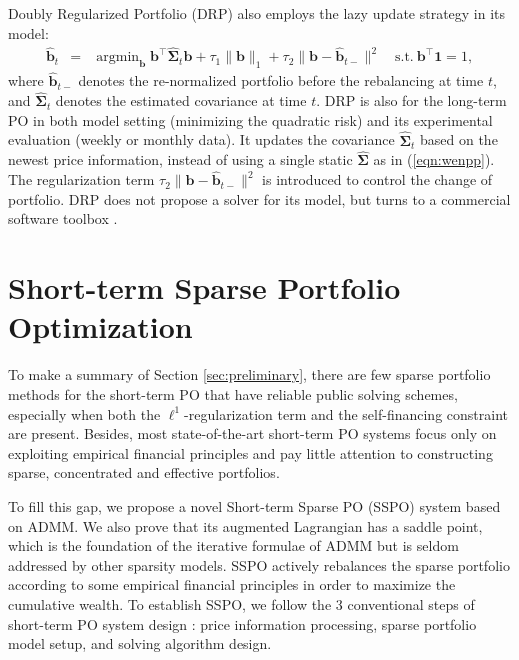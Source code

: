 \documentclass[twoside,11pt]{article}
\DeclareMathOperator*{\argmin}{argmin}
\begin{document}
Doubly Regularized Portfolio (DRP) \citep{doubleregu} also employs the lazy update strategy in its model:
\begin{eqnarray}
\label{eqn:drp}
\hat{\mathbf{b}}_{t}&=&\argmin_{\mathbf{b}} \mathbf{b}^\top \hat{\bm{\Sigma}}_t\mathbf{b} +\tau_1 \|\mathbf{b}\|_1+\tau_2\|\mathbf{b}-\hat{\mathbf{b}}_{t-}\|^2 \quad \text{s.t.} \:  \mathbf{b}^\top\mathbf{1}=1,
\end{eqnarray}
where $\hat{\mathbf{b}}_{t-}$ denotes the re-normalized portfolio before the rebalancing at time $t$, and $\hat{\bm{\Sigma}}_t$ denotes the estimated covariance at time $t$. DRP is also for the long-term PO in both model setting (minimizing the quadratic risk) and its experimental evaluation (weekly or monthly data). It updates the covariance $\hat{\bm{\Sigma}}_t$ based on the newest price information, instead of using a single static $\hat{\bm{\Sigma}}$ as in (\ref{eqn:wenpp}). The regularization term $\tau_2\|\mathbf{b}-\hat{\mathbf{b}}_{t-}\|^2$ is introduced to control the change of portfolio. DRP does not propose a solver for its model, but turns to a commercial software toolbox \citep{doubleregu}. 










\section{Short-term Sparse Portfolio Optimization}
\label{sec:EPOSC}
To make a summary of Section \ref{sec:preliminary}, there are few sparse portfolio methods for the short-term PO that have reliable public solving schemes, especially when both the $\ell^1$-regularization term and the self-financing constraint are present. Besides, most state-of-the-art short-term PO systems focus only on exploiting empirical financial principles and pay little attention to constructing sparse, concentrated and effective portfolios. 

To fill this gap, we propose a novel Short-term Sparse PO (SSPO) system based on ADMM. We also prove that its augmented Lagrangian has a saddle point, which is the foundation of the iterative formulae of ADMM but is seldom addressed by other sparsity models. SSPO actively rebalances the sparse portfolio according to some empirical financial principles in order to maximize the cumulative wealth. To establish SSPO, we follow the $3$ conventional steps of short-term PO system design \citep{anticor,CORN,olpssurvey,OLMAR,RMR2}: price information processing, sparse portfolio model setup, and solving algorithm design.
\end{document}
